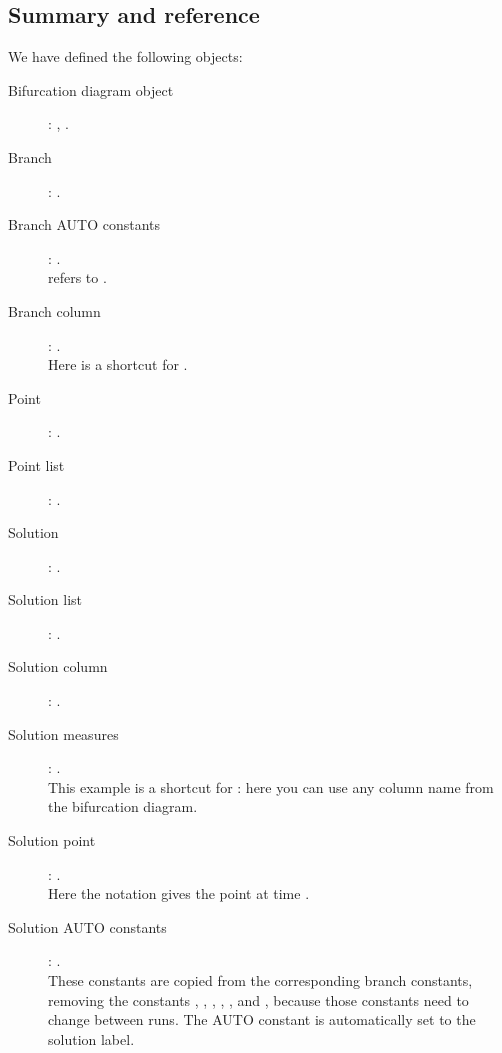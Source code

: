 \documentclass[12pt]{report}
\begin{document}
 \subsection{Summary and reference}
 We have defined the following objects:
 \begin{description}
   \item[Bifurcation diagram object]:
    , .
   \item[Branch]:
    .
   \item[Branch AUTO constants]:
    .\\
     refers to .
   \item[Branch column]:
    .\\
    Here  is a shortcut for .
   \item[Point]:
    .
   \item[Point list]:
    .
   \item[Solution]:
    .
   \item[Solution list]:
    .
   \item[Solution column]:
    .
   \item[Solution measures]:
    .\\
    This example is a shortcut for : here you
    can use any column name from the bifurcation diagram.
   \item[Solution point]:
    .\\
    Here the  notation gives the point at
    time .
   \item[Solution AUTO constants]:
    .\\
    These constants are copied from the corresponding branch
    constants, removing the constants , , ,
    , , and , because those constants need
    to change between runs. The AUTO constant
     is automatically set to the solution label.
 \end{description}
\end{document}
